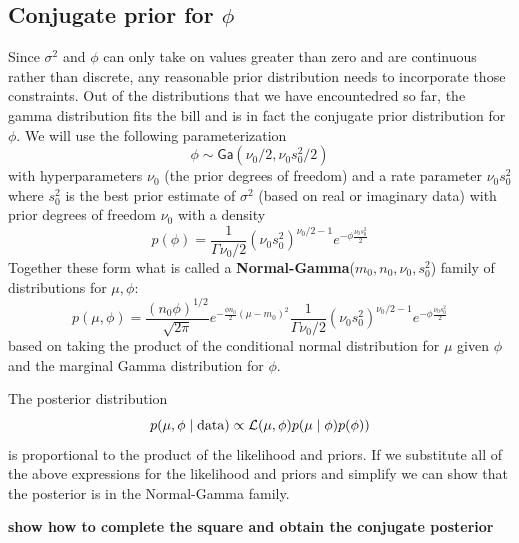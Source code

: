 \documentclass[11pt]{article}
\def\Ga{\textsf{Ga}}
\def\data{\text{data}}
\begin{document}
\subsection{Conjugate prior for $\phi$}
Since $\sigma^2$ and $\phi$ can only take on values greater than zero and are continuous rather than discrete,  any reasonable prior distribution needs to incorporate those constraints.  Out of the distributions that we have encountedred so far, the gamma distribution fits the bill and is in fact the conjugate prior distribution for $\phi$.  We will use the following parameterization
$$
\phi \sim \Ga(\nu_0/2, \nu_0 s^2_0/2)
$$
with hyperparameters  $\nu_0$ (the prior degrees of freedom) and a rate parameter $\nu_0 s^2_0$ where $s^2_0$ is the best prior estimate of $\sigma^2$  (based on real or imaginary data) with prior degrees of freedom $\nu_0$ with a density
$$p(\phi) = \frac{1}{\Gamma{\nu_0/2}} (\nu_0 s^2_0 )^{\nu_0/2 -1} e^{- \phi \frac{\nu_0 s^2_0} {2}}
$$
Together these form what is called a {\bf Normal-Gamma}($m_0, n_0, \nu_0, s^2_0$) family of distributions for $\mu, \phi$:
$$
p(\mu, \phi) = \frac{(n_0 \phi)^{1/2}} {\sqrt{2\pi}} e^{- \frac{\phi n_0}{2} (\mu -m_0)^2} \frac{1}{\Gamma{\nu_0/2}} (\nu_0 s^2_0 )^{\nu_0/2 -1} e^{- \phi \frac{\nu_0 s^2_0} {2}}
$$
based on taking the product of the conditional normal distribution for $\mu$ given $\phi$ and the marginal Gamma  distribution for $\phi$.

The posterior distribution 
$$
p(\mu, \phi \mid \data) \propto {\cal{L}}(\mu, \phi) p(\mu \mid \phi) p(\phi)
)
$$
is proportional to the product of the likelihood and priors.
If we substitute all of the above expressions for the likelihood and priors and simplify we can show that the posterior is in the Normal-Gamma family.

{\bf show how to complete the square and obtain the conjugate posterior}
\end{document}
